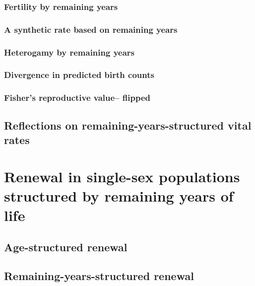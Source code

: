     \subsection{Fertility by remaining years}
      
      
    \subsection{A synthetic rate based on remaining years}
      
    
    \subsection{Heterogamy by remaining years}
      
      
    \subsection{Divergence in predicted birth counts}
      
    \subsection{Fisher's reproductive value-- flipped}
      
  \section{Reflections on remaining-years-structured vital rates}
      

\chapter{Renewal in single-sex populations structured by remaining years of
life}
    
    \section{Age-structured renewal}
      
    
    \section{Remaining-years-structured renewal}
      
    
